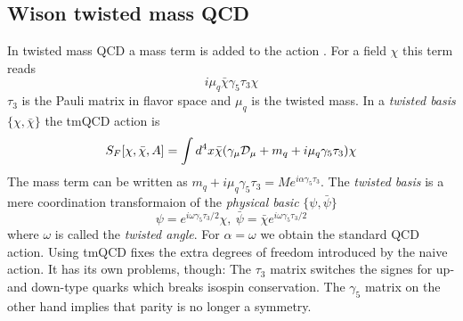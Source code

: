 	\subsection{Wison twisted mass QCD}
	
	In twisted mass QCD a mass term is added to the action . For a field $\chi$ this term reads \cite{twisted_mass_qcd}
	\begin{equation}
	    i\mu_q\bar{\chi}\gamma_5\tau_3\chi
	\end{equation}
	$\tau_3$ is the Pauli matrix in flavor space and $\mu_q$ is the twisted mass. In a \textit{twisted basis} $\{\chi,\bar{\chi}\}$ the tmQCD action is
	\begin{equation}
	    S_F[\chi,\bar{\chi},A] = \int d^4x\bar{\chi}(\gamma_\mu \mathcal{D}_\mu + m_q + i\mu_q \gamma_5\tau_3)\chi
	\end{equation}
	The mass term can be written as $m_q + i\mu_q\gamma_5\tau_3 = Me^{i\alpha\gamma_5\tau_3}$. The \textit{twisted basis} is a mere coordination transformaion of the \textit{physical basic} $\{\psi,\bar{\psi}\}$
	\begin{equation}
	    \psi = e^{i\omega\gamma_5\tau_3/2}\chi,\ \bar{\psi} = \bar{\chi}e^{i\omega\gamma_5\tau_3/2}
	\end{equation}
	where $\omega$ is called the \textit{twisted angle}. For $\alpha = \omega$ we obtain the standard QCD action. Using tmQCD fixes the extra degrees of freedom introduced by the naive action. It has its own problems, though: The $\tau_3$ matrix switches the signes for up- and down-type quarks which breaks isospin conservation. The $\gamma_5$ matrix on the other hand implies that parity is no longer a symmetry.
	
